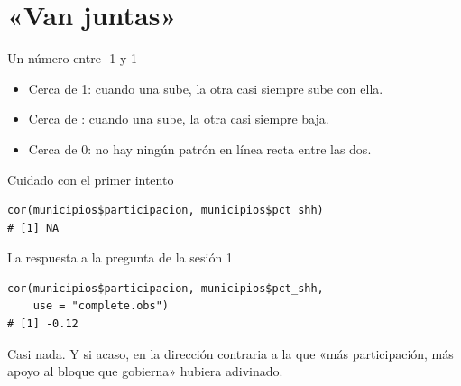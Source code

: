 \section{«Van juntas»}

\begin{frame}{Un número entre -1 y 1}
  \vspace{0.3em}
  \begin{itemize}\setlength{\itemsep}{0.85em}
    \item<1-> Cerca de \ac{1}: cuando una sube, la otra casi siempre sube
          con ella.
    \item<2-> Cerca de : cuando una sube, la otra casi siempre
          baja.
    \item<3-> Cerca de \ac{0}: no hay ningún patrón en línea recta entre
          las dos.
  \end{itemize}

  \vspace{1.0em}
\end{frame}

\begin{frame}[fragile]{Cuidado con el primer intento}
\begin{lstlisting}
cor(municipios$participacion, municipios$pct_shh)
# [1] NA
\end{lstlisting}

  \vspace{0.7em}
\end{frame}

\begin{frame}[fragile]{La respuesta a la pregunta de la sesión 1}
\begin{lstlisting}
cor(municipios$participacion, municipios$pct_shh,
    use = "complete.obs")
# [1] -0.12
\end{lstlisting}

  \vspace{0.7em}
  Casi nada. Y si acaso, en la dirección contraria a la que «más
  participación, más apoyo al bloque que gobierna» hubiera adivinado.
\end{frame}

